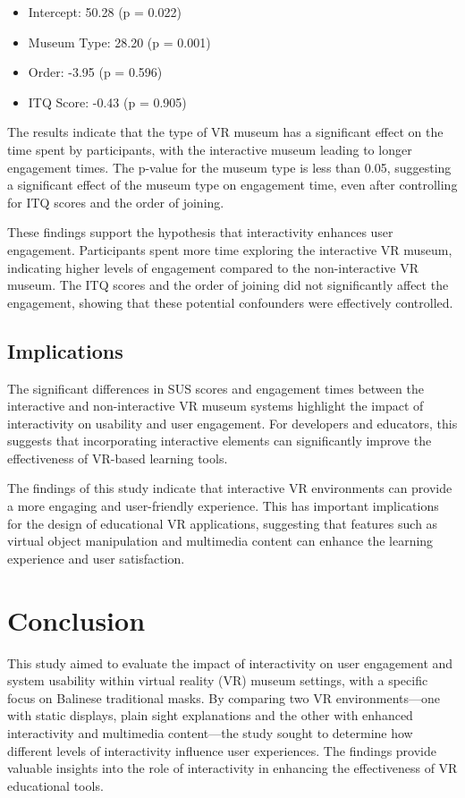 \documentclass[conference]{IEEEtran}
\begin{document}
\begin{itemize}
    \item Intercept: 50.28 (p = 0.022)
    \item Museum Type: 28.20 (p = 0.001)
    \item Order: -3.95 (p = 0.596)
    \item ITQ Score: -0.43 (p = 0.905)
\end{itemize}

The results indicate that the type of VR museum has a significant effect on the time spent by participants, with the interactive museum leading to longer engagement times. The p-value for the museum type is less than 0.05, suggesting a significant effect of the museum type on engagement time, even after controlling for ITQ scores and the order of joining.

These findings support the hypothesis that interactivity enhances user engagement. Participants spent more time exploring the interactive VR museum, indicating higher levels of engagement compared to the non-interactive VR museum. The ITQ scores and the order of joining did not significantly affect the engagement, showing that these potential confounders were effectively controlled.

\subsection{Implications}

The significant differences in SUS scores and engagement times between the interactive and non-interactive VR museum systems highlight the impact of interactivity on usability and user engagement. For developers and educators, this suggests that incorporating interactive elements can significantly improve the effectiveness of VR-based learning tools.

The findings of this study indicate that interactive VR environments can provide a more engaging and user-friendly experience. This has important implications for the design of educational VR applications, suggesting that features such as virtual object manipulation and multimedia content can enhance the learning experience and user satisfaction.

\section{Conclusion}

This study aimed to evaluate the impact of interactivity on user engagement and system usability within virtual reality (VR) museum settings, with a specific focus on Balinese traditional masks. By comparing two VR environments—one with static displays, plain sight explanations and the other with enhanced interactivity and multimedia content—the study sought to determine how different levels of interactivity influence user experiences. The findings provide valuable insights into the role of interactivity in enhancing the effectiveness of VR educational tools.
\end{document}

